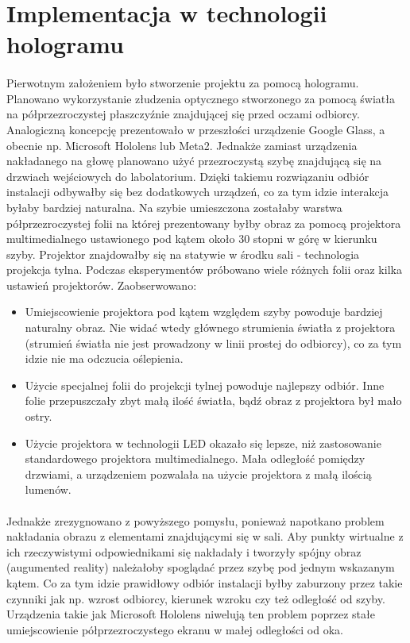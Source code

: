 \section{Implementacja w technologii hologramu}
\paragraph{}
Pierwotnym założeniem było stworzenie projektu za pomocą hologramu. Planowano wykorzystanie złudzenia optycznego stworzonego za pomocą światła na półprzezroczystej płaszczyźnie znajdującej się przed oczami odbiorcy. Analogiczną koncepcję prezentowało w przeszłości urządzenie Google Glass, a obecnie np. Microsoft Hololens lub Meta2.
\newline
Jednakże zamiast urządzenia nakładanego na głowę planowano użyć przezroczystą szybę znajdującą się na drzwiach wejściowych do labolatorium. Dzięki takiemu rozwiązaniu odbiór instalacji odbywałby się bez dodatkowych urządzeń, co za tym idzie interakcja byłaby bardziej naturalna.
Na szybie umieszczona zostałaby warstwa półprzezroczystej folii na której prezentowany byłby obraz za pomocą projektora multimedialnego ustawionego pod kątem około 30 stopni w górę w kierunku szyby. Projektor znajdowałby się na statywie w środku sali - technologia projekcja tylna.
\newline
Podczas eksperymentów próbowano wiele różnych folii oraz kilka ustawień projektorów. 
\newline
Zaobserwowano:
\begin{itemize}
	\item Umiejscowienie projektora pod kątem względem szyby powoduje bardziej naturalny obraz. Nie widać wtedy głównego strumienia światła z projektora (strumień światła nie jest prowadzony w linii prostej do odbiorcy), co za tym idzie  nie ma odczucia oślepienia.
    \item Użycie specjalnej folii do projekcji tylnej powoduje najlepszy odbiór. Inne folie przepuszczały zbyt małą ilość światła, bądź obraz z projektora był mało ostry.
    \item Użycie projektora w technologii LED okazało się lepsze, niż zastosowanie standardowego projektora multimedialnego. Mała odległość pomiędzy drzwiami, a urządzeniem pozwalała na użycie projektora z małą ilością lumenów.
\end{itemize}

\paragraph{}
Jednakże zrezygnowano z powyższego pomysłu, ponieważ napotkano problem nakładania obrazu z  elementami znajdującymi się w sali. Aby punkty wirtualne z ich rzeczywistymi odpowiednikami się nakładały i tworzyły spójny obraz (augumented reality) należałoby spoglądać przez szybę pod jednym wskazanym kątem. Co za tym idzie prawidłowy odbiór instalacji byłby zaburzony przez takie czynniki jak np. wzrost odbiorcy, kierunek wzroku czy też odległość od szyby. Urządzenia takie jak Microsoft Hololens niwelują ten problem poprzez stałe umiejscowienie półprzezroczystego ekranu w małej odległości od oka. 

